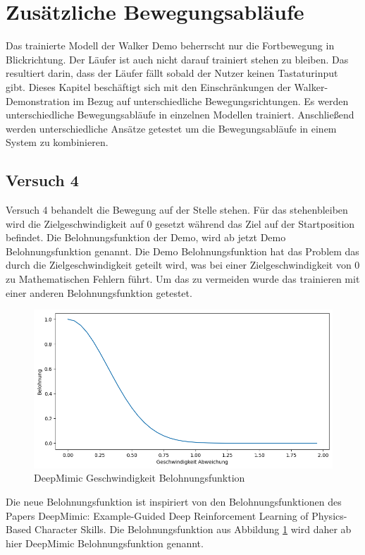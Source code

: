 \section{Zusätzliche Bewegungsabläufe}
Das trainierte Modell der Walker Demo beherrscht nur die Fortbewegung in Blickrichtung. Der Läufer ist auch nicht darauf trainiert stehen zu bleiben. Das resultiert darin, dass der Läufer fällt sobald der Nutzer keinen Tastaturinput gibt. Dieses Kapitel beschäftigt sich mit den Einschränkungen der Walker-Demonstration im Bezug auf unterschiedliche Bewegungsrichtungen. Es werden unterschiedliche Bewegungsabläufe in einzelnen Modellen trainiert. Anschließend werden unterschiedliche Ansätze getestet um die Bewegungsabläufe in einem System zu kombinieren.

\subsection{Versuch 4}
\label{subsec:versuch4}
Versuch 4 behandelt die Bewegung auf der Stelle stehen. Für das stehenbleiben wird die Zielgeschwindigkeit auf 0 gesetzt während das Ziel auf der Startposition befindet. Die Belohnungsfunktion der Demo, wird ab jetzt Demo Belohnungsfunktion genannt. Die Demo Belohnungsfunktion hat das Problem das durch die Zielgeschwindigkeit geteilt wird, was bei einer Zielgeschwindigkeit von 0 zu Mathematischen Fehlern führt. Um das zu vermeiden wurde das trainieren mit einer anderen Belohnungsfunktion getestet.
\begin{figure}[H]
  \centering  
  \includegraphics[scale=0.5]{img/plot_deepmimic_vel.png}
  \caption{DeepMimic Geschwindigkeit Belohnungsfunktion}
  \label{fig:plot_deepmimic_vel}
\end{figure}
Die neue Belohnungsfunktion ist inspiriert von den Belohnungsfunktionen des Papers \grqq{}DeepMimic: Example-Guided Deep Reinforcement Learning of Physics-Based Character Skills\grqq{}.\cite{peng2018deepmimic}
Die Belohnungsfunktion aus Abbildung \ref{fig:plot_deepmimic_vel} wird daher ab hier DeepMimic Belohnungsfunktion genannt.

